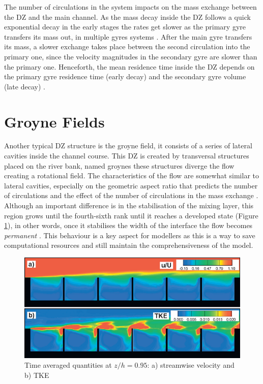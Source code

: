 The number of circulations in the system impacts on the mass exchange between the DZ and the main channel. As the mass decay inside the DZ follows a quick exponential decay in the early stages the rates get slower as the primary gyre transfers its mass out, in multiple gyres systems \cite{jackson2012}. After the main gyre transfers its mass, a slower exchange takes place between the second circulation into the primary one, since the velocity magnitudes in the secondary gyre are slower than the primary one. Henceforth, the mean residence time inside the DZ depends on the primary gyre residence time (early decay) and the secondary gyre volume (late decay) \cite{jackson2013}.

\section{Groyne Fields}
Another typical DZ structure is the groyne field, it consists of a series of lateral cavities inside the channel course. This DZ is created by transversal structures placed on the river bank, named groynes these structures diverge the flow creating a rotational field. The characteristics of the flow are somewhat similar to lateral cavities, especially on the geometric aspect ratio that predicts the number of circulations \cite{weitbrecht2004,uijttewaal2005,xiang2020} and the effect of the number of circulations in the mass exchange \cite{deOliveira2020}. Although an important difference is in the stabilisation of the mixing layer, this region grows until the fourth-sixth rank until it reaches a developed state (Figure \ref{fig:groyneStabilisation}), in other words, once it stabilises the width of the interface the flow becomes \textit{permanent} \cite{weitbrecht2004, mcCoy2008, xiang2020}. This behaviour is a key aspect for modellers as this is a way to save computational resources and still maintain the comprehensiveness of the model.

\begin{figure}[!ht]
\centering
\includegraphics[width=0.9\linewidth]{../images/introduction/groyneStabilisation.png}
\caption{Time averaged quantities at $z/h=0.95$: a) streamwise velocity and b) TKE \cite{mcCoy2008}}
\label{fig:groyneStabilisation}
\end{figure}

